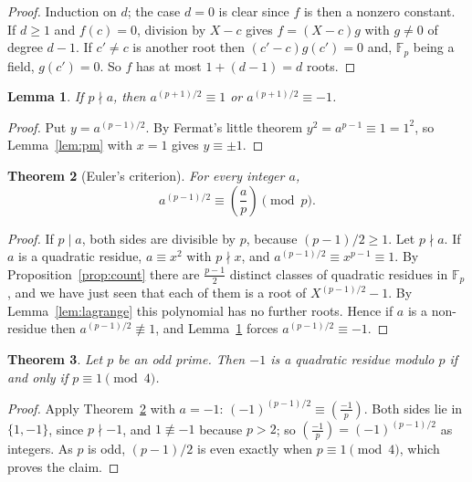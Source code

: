 \documentclass[11pt]{amsart}
\newtheorem{theorem}{Theorem}[section]
\newtheorem{lemma}[theorem]{Lemma}
\theoremstyle{definition}
\theoremstyle{remark}
\newcommand{\leg}[2]{\left(\frac{#1}{#2}\right)}
\begin{document}
\begin{proof}
Induction on $d$; the case $d=0$ is clear since $f$ is then a nonzero
constant. If $d\ge1$ and $f(c)=0$, division by $X-c$ gives
$f=(X-c)g$ with $g\neq0$ of degree $d-1$. If $c'\ne c$ is another root then
$(c'-c)g(c')=0$ and, $\mathbb{F}_p$ being a field, $g(c')=0$. So $f$ has at
most $1+(d-1)=d$ roots.
\end{proof}

\begin{lemma}\label{lem:sign}
If $p\nmid a$, then $a^{(p+1)/2}\equiv 1$ or $a^{(p+1)/2}\equiv -1$.
\end{lemma}

\begin{proof}
Put $y=a^{(p-1)/2}$. By Fermat's little theorem $y^2=a^{p-1}\equiv 1 = 1^2$,
so Lemma~\ref{lem:pm} with $x=1$ gives $y\equiv\pm1$.
\end{proof}

\begin{theorem}[Euler's criterion]\label{thm:euler}
For every integer $a$,
\[
a^{(p-1)/2}\equiv \leg{a}{p} \pmod p.
\]
\end{theorem}

\begin{proof}
If $p\mid a$, both sides are divisible by $p$, because $(p-1)/2\ge1$. Let
$p\nmid a$. If $a$ is a quadratic residue, $a\equiv x^2$ with $p\nmid x$, and
$a^{(p-1)/2}\equiv x^{p-1}\equiv 1$. By Proposition~\ref{prop:count} there are
$\frac{p-1}{2}$ distinct classes of quadratic residues in $\mathbb{F}_p$, and we
have just seen that each of them is a root of $X^{(p-1)/2}-1$. By
Lemma~\ref{lem:lagrange} this polynomial has no further roots. Hence if $a$
is a non-residue then $a^{(p-1)/2}\not\equiv1$, and Lemma~\ref{lem:sign} forces
$a^{(p-1)/2}\equiv-1$.
\end{proof}

\begin{theorem}\label{thm:main}
Let $p$ be an odd prime. Then $-1$ is a quadratic residue modulo $p$ if and
only if $p\equiv 1\pmod 4$.
\end{theorem}

\begin{proof}
Apply Theorem~\ref{thm:euler} with $a=-1$: $(-1)^{(p-1)/2}\equiv\leg{-1}{p}$.
Both sides lie in $\{1,-1\}$, since $p\nmid -1$, and $1\not\equiv-1$ because
$p>2$; so $\leg{-1}{p}=(-1)^{(p-1)/2}$ as integers. As $p$ is odd,
$(p-1)/2$ is even exactly when $p\equiv1\pmod4$, which proves the claim.
\end{proof}
\end{document}
